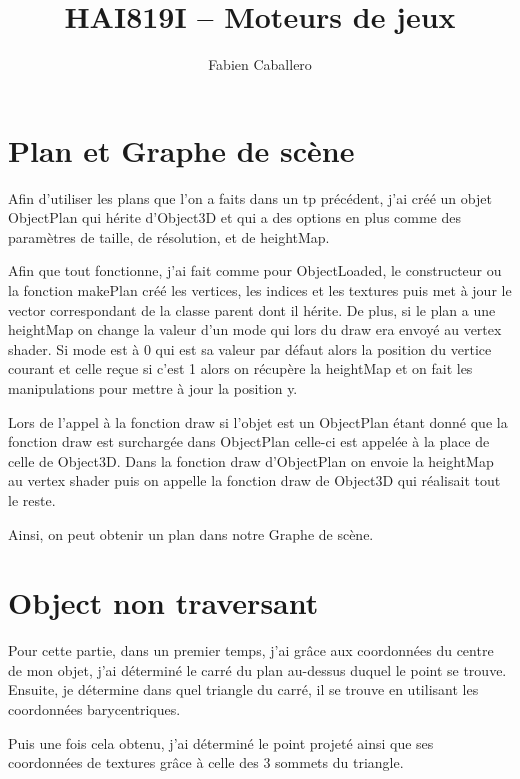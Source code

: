 \documentclass{article}
\title{HAI819I – Moteurs de jeux
}
\author{Fabien Caballero}
\begin{document}
\maketitle
    \tableofcontents

\newpage
\section{Plan et Graphe de scène}
Afin d'utiliser les plans que l'on a faits dans un tp précédent, j'ai créé un objet ObjectPlan qui hérite d'Object3D et qui a des options en plus comme des paramètres de taille, de résolution, et de heightMap.





Afin que tout fonctionne, j'ai fait comme pour ObjectLoaded, le constructeur ou la fonction makePlan créé les vertices, les indices et les textures puis met à jour le vector correspondant de la classe parent dont il hérite. De plus, si le plan a une heightMap on change la valeur d'un mode qui lors du draw era envoyé au vertex shader. Si mode est à 0 qui est sa valeur par défaut alors la position du vertice courant et celle reçue si c'est 1 alors on récupère la heightMap et on fait les manipulations pour mettre à jour la position y.





Lors de l'appel à la fonction draw si l'objet est un ObjectPlan étant donné que la fonction draw est surchargée dans ObjectPlan celle-ci est appelée à la place de celle de Object3D. Dans la fonction draw d'ObjectPlan on envoie la heightMap au vertex shader puis on appelle la fonction draw de Object3D qui réalisait tout le reste.





Ainsi, on peut obtenir un plan dans notre Graphe de scène.
\section{Object non traversant}
Pour cette partie, dans un premier temps, j'ai grâce aux coordonnées du centre de mon objet, j'ai déterminé le carré du plan au-dessus duquel le point se trouve. Ensuite, je détermine dans quel triangle du carré, il se trouve en utilisant les coordonnées barycentriques.



Puis une fois cela obtenu, j'ai déterminé le point projeté ainsi que ses coordonnées de textures grâce à celle des 3 sommets du triangle.
\end{document}
